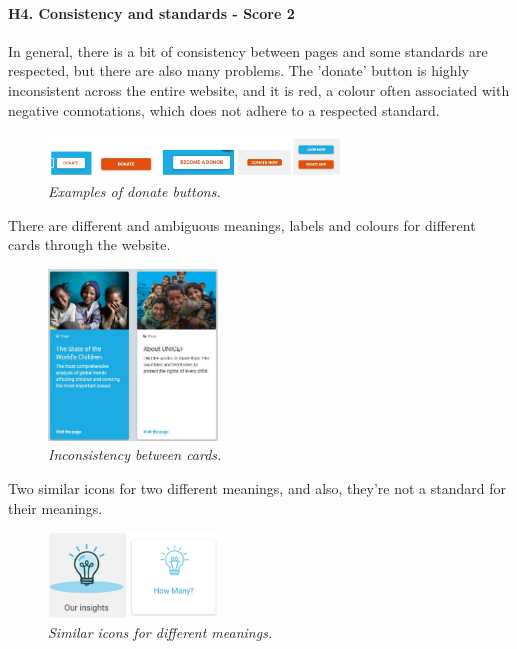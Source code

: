\paragraph{H4. Consistency and standards - Score 2} \label{subsec:H4}	In general, there is a bit of consistency between pages and some standards are respected, but there are also many problems.
\newline The 'donate' button is highly inconsistent across the entire website, and it is red, a colour often associated with negative connotations, which does not adhere to a respected standard.
\begin{figure}[!h]
	\begin{center}
		\includegraphics[width=0.7\textwidth]{FinalScores8.jpg}
		\captionsetup{font=small}
		\caption{\textit{Examples of donate buttons.}}
	\end{center}
\end{figure}
\newline There are different and ambiguous meanings, labels and colours for different cards through the website.
\begin{figure}[!h]
	\begin{center}
		\includegraphics[width=0.4\textwidth]{FinalScores9.jpg}
		\captionsetup{font=small}
		\caption{\textit{Inconsistency between cards.}}
	\end{center}
\end{figure}
\newline Two similar icons for two different meanings, and also, they’re not a standard for their meanings.
\begin{figure}[!h]
	\begin{center}
		\includegraphics[width=0.4\textwidth]{FinalScores10.jpg}
		\captionsetup{font=small}
		\caption{\textit{Similar icons for different meanings.}}
	\end{center}
\end{figure}
